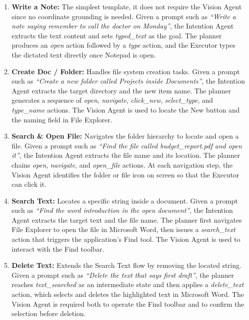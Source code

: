\begin{enumerate}
  \item \textbf{Write a Note:} The simplest template, it does not require the Vision Agent since no coordinate grounding is needed. Given a prompt such as \textit{``Write a note saying remember to call the doctor on Monday''}, the Intention Agent extracts the text content and sets \textit{typed\_text} as the goal. The planner produces an \textit{open} action followed by a \textit{type} action, and the Executor types the dictated text directly once Notepad is open.

  \item \textbf{Create Doc / Folder:} Handles file system creation tasks. Given a prompt such as \textit{``Create a new folder called Projects inside Documents''}, the Intention Agent extracts the target directory and the new item name. The planner generates a sequence of \textit{open}, \textit{navigate}, \textit{click\_new}, \textit{select\_type}, and \textit{type\_name} actions. The Vision Agent is used to locate the New button and the naming field in File Explorer.

  \item \textbf{Search \& Open File:} Navigates the folder hierarchy to locate and open a file. Given a prompt such as \textit{``Find the file called budget\_report.pdf and open it''}, the Intention Agent extracts the file name and its location. The planner chains \textit{open}, \textit{navigate}, and \textit{open\_file} actions. At each navigation step, the Vision Agent identifies the folder or file icon on screen so that the Executor can click it.

  \item \textbf{Search Text:} Locates a specific string inside a document. Given a prompt such as \textit{``Find the word introduction in the open document''}, the Intention Agent extracts the target text and the file name. The planner first navigates File Explorer to open the file in Microsoft Word, then issues a \textit{search\_text} action that triggers the application's Find tool. The Vision Agent is used to interact with the Find toolbar.

  \item \textbf{Delete Text:} Extends the Search Text flow by removing the located string. Given a prompt such as \textit{``Delete the text that says first draft''}, the planner reaches \textit{text\_searched} as an intermediate state and then applies a \textit{delete\_text} action, which selects and deletes the highlighted text in Microsoft Word. The Vision Agent is required both to operate the Find toolbar and to confirm the selection before deletion.


\end{enumerate}
